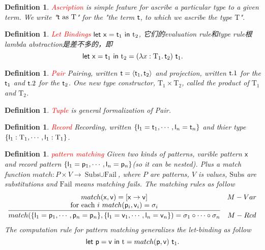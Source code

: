\documentclass{article}
\theoremstyle{plain}
\newtheorem{definition}[theorem]{Definition}
\theoremstyle{nonumberplain}
\newcommand*{\xfunc}[4]{{#2}\colon{#3}{#1}{#4}}
\newcommand*{\func}[3]{\xfunc{\to}{#1}{#2}{#3}}
\newcommand{\lam}[2]{\ensuremath{\lambda #1\ldotp #2}} %
\newcommand{\projone}[1]{\ensuremath{#1.1}}
\newcommand{\projtwo}[1]{\ensuremath{#1.2}}
\newcommand{\singletype}[1]{\text{#1}}
\newcommand{\termtype}[2]{\ensuremath{#1:#2}}
\newcommand{\term}[1]{\ensuremath\mathsf{#1}}
\newcommand{\redt}[1]{\textcolor{red}{#1}}
\begin{document}
\begin{definition}
\rm \redt{Ascription} is simple feature for ascribe a particular type to a given term. We write "$\term{t}~\text{as}~\singletype{T}$" for the "the term $\term{t}$, to which we ascribe the type $\singletype{T}$".  
\end{definition}

\begin{definition}
\rm \redt{Let Bindings} $\term{let}~ \term{x}=\term{t}_1~\term{in}~\text{t}_2$, 它们的evaluation rule和type rule根lambda abstraction是差不多的，即
$$
\term{let}~ \term{x}=\term{t}_1~\term{in}~\text{t}_2 = (\lam{\termtype{x}{\singletype{T}_1}}{\term{t}_2})~\term{t}_1. 
$$
\end{definition}


\begin{definition}
\rm \redt{Pair} Pairing, written $\term{t}=\left<\term{t}_1,\term{t}_2\right>$ and projection, written $\projone{\term{t}}$ for the $\term{t}_1$ and $\projtwo{\term{t}}$ for the $\term{t}_2$. One new type constructor, $\singletype{T}_1 \times \singletype{T}_2$, called the product of $\singletype{T}_1$ and $\singletype{T}_2$.
\end{definition}

\begin{definition}
\rm \redt{Tuple} is general formalization of Pair.
\end{definition}

\begin{definition}
\rm \redt{Record} Recording, written $\{\term{l}_1 =\term{t}_1, \cdots, \term{l}_n =\term{t}_n\}$ and thier type $\{\termtype{\term{l}_1}{\singletype{T}_1}, \cdots, \termtype{\term{l}_1}{\singletype{T}_1}\}$. 
\end{definition}

\begin{definition}
\rm \redt{pattern matching} Given two kinds of patterns, varible pattern $\term{x}$ and record pattern $\{\term{l}_1 =\term{p}_1, \cdots, \term{l}_n =\term{p}_n\}$(so it can be nested). Plus a match function $\func{match}{P \times V}{\text{Subs} \cup \text{Fail}}$, where $P$ are patterns, $V$ is values, $\text{Subs}$ are substitutions and $\text{Fail}$ means matching fails. The matching rules as follow
$$
\begin{array}{cc}
match(\term{x}, \term{v}) = [\term{x} \to \term{v}] & M-Var \\
\infer{match(\{\term{l}_1 =\term{p}_1, \cdots, \term{p}_n =\term{p}_n\}, \{\term{l}_1 =\term{v}_1, \cdots, \term{l}_n =\term{v}_n\}) = \sigma_1 \circ \cdots \circ \sigma_n}{\text{for each}~i~match(\term{p}_i,\term{v}_i)= \sigma_i}& M-Rcd
\end{array}
$$
The computation rule for pattern matching generalizes the let-binding as follow
$$
\term{let}~ \term{p}=\term{v}~\term{in}~\text{t} = match(\term{p},\term{v})~\term{t}_1. 
$$
\end{definition}
\end{document}
